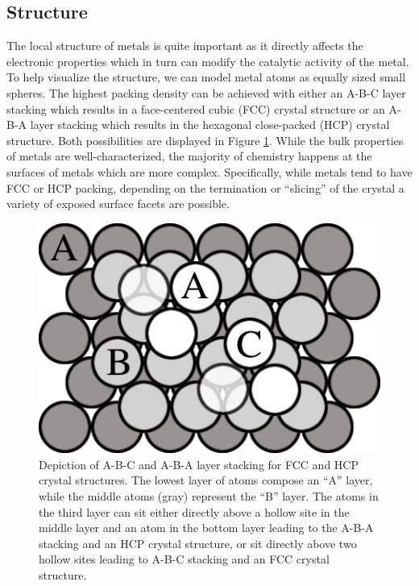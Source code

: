 \subsection{Structure}
The local structure of metals is quite important as it directly affects the
electronic properties which in turn can modify the catalytic activity of the
metal. To help visualize the structure, we can model metal atoms as equally
sized small spheres. The highest packing density can be achieved with either an A-B-C
layer stacking which results in a face-centered cubic (FCC) crystal structure
or an A-B-A layer stacking which results in the hexagonal close-packed (HCP)
crystal structure. Both possibilities are displayed in Figure
\ref{fig:packing}. While the bulk properties of metals are well-characterized,
the majority of chemistry happens at the surfaces of metals which
are more complex. Specifically, while metals tend to have FCC or HCP packing,
depending on the termination or ``slicing'' of the crystal a variety of exposed
surface facets are possible.

\begin{figure}[p!]
  \includegraphics[width=\linewidth]{../figures/chap1/packing.pdf}
  \caption{Depiction of A-B-C and A-B-A layer stacking for FCC and HCP crystal
structures. The lowest layer of atoms compose an ``A'' layer, while the middle
atoms (gray) represent the ``B'' layer. The atoms in the third layer can sit
either directly above a hollow site in the middle layer and an atom in the
bottom layer leading to the A-B-A stacking and an HCP crystal structure, or sit
directly above two hollow sites leading to A-B-C stacking and an FCC crystal
structure.}
  \label{fig:packing}
\end{figure}


